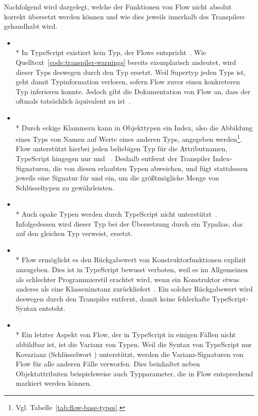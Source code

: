 Nachfolgend wird dargelegt, welche der Funktionen von Flow nicht absolut korrekt übersetzt werden können und wie dies jeweils innerhalb des Transpilers gehandhabt wird.

\begin{itemize}
  \item {}\\*
    In TypeScript existiert kein Typ, der Flows  entspricht~\autocite{TS:GITHUB:NO_EXISTENTIAL_TYPE}. Wie Quelltext~\ref{code:transpiler-warnings} bereits exemplarisch andeutet, wird dieser Typs deswegen durch den Typ  ersetzt. Weil  Supertyp jeden Typs ist, geht damit Typinformation verloren, sofern Flow zuvor einen konkreteren Typ inferieren konnte. Jedoch gibt die Dokumentation von Flow an, dass der  oftmals tatsächlich äquivalent zu  ist~\autocite{FLOW:LINT_RULE_REFERENCE}.
  \medbreak
  \item {}\\*
    Durch eckige Klammern kann in Objekttypen ein Index, also die Abbildung eines Typs von Namen auf Werte eines anderen Typs, angegeben werden\footnote{Vgl. Tabelle~\ref{tab:flow-base-types}.}. Flow unterstützt hierbei jeden beliebigen Typ für die Attributnamen, TypeScript hingegen nur  und ~\autocite{TS:HANDBOOK:INTERFACES}. Deshalb entfernt der Transpiler Index-Signaturen, die von diesen erlaubten Typen abweichen, und fügt stattdessen jeweils eine Signatur für  und  ein, um die größtmögliche Menge von Schlüsseltypen zu gewährleisten.
  \medbreak
  \item {}\\*
    Auch opake Typen werden durch TypeScript nicht unterstützt~\autocite{TS:GITHUB:NO_OPAQUE_TYPE}. Infolgedessen wird dieser Typ bei der Übersetzung durch ein Typalias, das auf den gleichen Typ verweist, ersetzt.
  \medbreak
  \item {}\\*
    Flow ermöglicht es den Rückgabewert von Konstruktorfunktionen explizit anzugeben. Dies ist in TypeScript bewusst verboten, weil es im Allgemeinen als schlechter Programmierstil erachtet wird, wenn ein Konstruktor etwas anderes als eine Klasseninstanz zurückliefert~\autocite{TS:GITHUB:CONSTRUCTOR_RETURN_TYPE}. Ein solcher Rückgabewert wird deswegen durch den Transpiler entfernt, damit keine fehlerhafte TypeScript-Syntax entsteht.
  \medbreak
  \item {}\\*
    Ein letzter Aspekt von Flow, der in TypeScript in einigen Fällen nicht abbildbar ist, ist die Varianz von Typen. Weil die Syntax von TypeScript nur Kovarianz (Schlüsselwort ) unterstützt, werden die Varianz-Signaturen von Flow für alle anderen Fälle verworfen. Dies beinhaltet neben Objektattributen beispielsweise auch Typparameter, die in Flow entsprechend markiert werden können.
\end{itemize}

